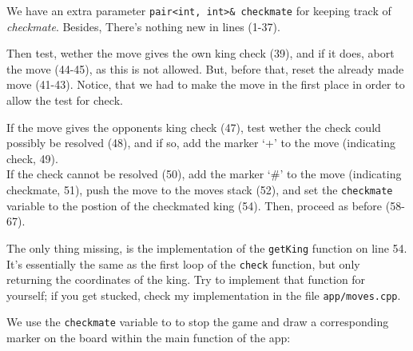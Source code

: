 We have an extra parameter \texttt{pair<int, int>& checkmate} for keeping track of \emph{checkmate}.
Besides, There's nothing new in lines (1-37).

Then test, wether the move gives the own king check (39), and if it does, abort the move (44-45), as
this is not allowed.
But, before that, reset the already made move (41-43).
Notice, that we had to make the move in the first place in order to allow the test for check.

If the move gives the opponents king check (47), test wether the check could possibly be
resolved (48), and if so, add the marker `+' to the move (indicating check, 49).\\
If the check cannot be resolved (50), add the marker `\#' to the move (indicating checkmate, 51),
push the move to the moves stack (52), and set the \texttt{checkmate} variable to the postion
of the checkmated king (54).
Then, proceed as before (58-67).

The only thing missing, is the implementation of the \texttt{getKing} function on line 54.
It's essentially the same as the first loop of the \texttt{check} function, but only returning
the coordinates of the king.
Try to implement that function for yourself; if you get stucked, check my implementation in the
file \texttt{app/moves.cpp}.

We use the \texttt{checkmate} variable to to stop the game and draw a corresponding marker on the board
within the main function of the app:

